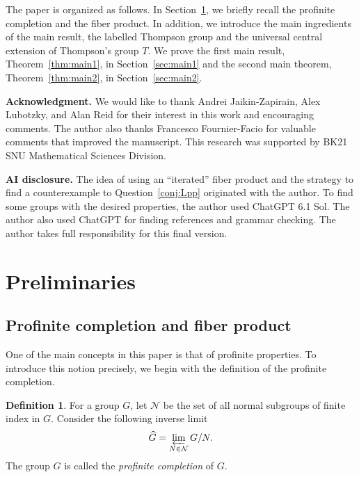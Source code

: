 \documentclass[11pt]{amsart}
\theoremstyle{definition}
\newtheorem{defn}[thm]{Definition}
\begin{document}
The paper is organized as follows.
In Section~\ref{sec:prelim}, we briefly recall the profinite completion and the fiber product.
In addition, we introduce the main ingredients of the main result, the labelled Thompson group and the universal central extension of Thompson's group $T$.
We prove the first main result, Theorem~\ref{thm:main1}, in Section~\ref{sec:main1} and the second main theorem, Theorem~\ref{thm:main2}, in Section~\ref{sec:main2}.

\vspace{0.4cm}

\noindent \textbf{Acknowledgment.}
 We would like to thank Andrei Jaikin-Zapirain, Alex Lubotzky, and Alan Reid for their interest in this work and encouraging comments.
The author also thanks Francesco Fournier-Facio for valuable comments that improved the manuscript.
This research was supported by BK21 SNU Mathematical Sciences Division.

\vspace{0.4cm}

\noindent \textbf{AI disclosure.}
The idea of using an ``iterated'' fiber product and the strategy to find a counterexample to Question~\ref{conj:Lpp} originated with the author.
To find some groups with the desired properties, the author used ChatGPT 6.1 Sol.
The author also used ChatGPT for finding references and grammar checking.
The author takes full responsibility for this final version.

\section{Preliminaries}\label{sec:prelim}

\subsection{Profinite completion and fiber product} \label{subsec:profinite}
 One of the main concepts in this paper is that of profinite properties.
  To introduce this notion precisely, we begin with the definition of the profinite completion.

\begin{defn}
 For a group $G$, let $\mathcal{N}$ be the set of all normal subgroups of finite index in $G$.
Consider the following inverse limit
\[
\widehat{G}=\varprojlim_{N\in\mathcal{N}} G/N.
\]
The group $\widehat{G}$ is called the \emph{profinite completion} of $G$.
\end{defn}
 
\end{document}

